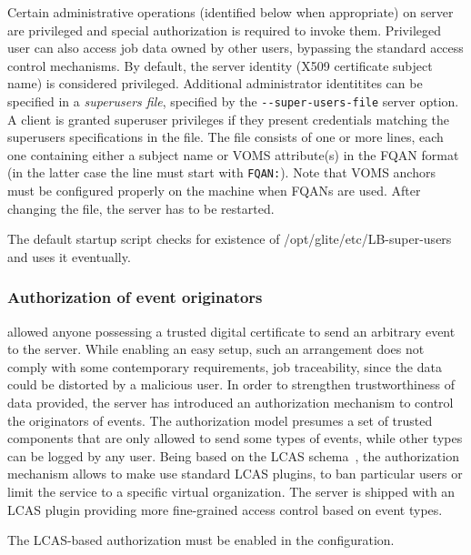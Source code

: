 Certain administrative operations (identified below when appropriate) on \LB
server are privileged and special authorization is required to invoke them.
Privileged user can also access job data owned by other users, bypassing the
standard \LB access control mechanisms.  By default, the \LB server identity
(X509 certificate subject name) is considered privileged.  Additional
administrator identitites can be specified in a \emph{superusers file},
specified by the \verb'--super-users-file' server option.  A client is granted
superuser privileges if they present credentials matching the superusers
specifications in the file.  The file consists of one or more lines, each one
containing either a subject name or VOMS attribute(s) in the FQAN format (in
the latter case the line must start with \verb'FQAN:').  Note that VOMS anchors
must be configured properly on the \LB machine when FQANs are used.  After
changing the file, the server has to be restarted. 

The default startup script checks for existence of 
/opt/glite/etc/LB-super-users and uses it eventually.

\subsubsection{Authorization of event originators}
\LBold allowed anyone possessing a trusted digital certificate to send an
arbitrary event to the \LB server. While enabling an easy setup, such an
arrangement does not comply with some contemporary requirements, \eg job
traceability, since the data could be distorted by a malicious user.  In order
to strengthen trustworthiness of data provided, the \LBnew server has
introduced an authorization mechanism to control the originators of events.
The authorization model presumes a set of trusted components that are only
allowed to send some types of events, while other types can be logged by any
user. Being based on the LCAS schema~\cite{lcas}, the authorization mechanism
allows to make use standard LCAS plugins, \eg to ban particular users or limit
the service to a specific virtual organization. The \LB server is shipped with
an LCAS plugin providing more fine-grained access control based on event types.

The LCAS-based authorization must be enabled in the \LB configuration.



